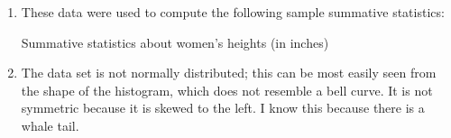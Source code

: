 \documentclass{article}
\begin{document}
\begin{enumerate}
  \item These data were used to compute the following sample summative statistics:
    \begin{table}[H]
      \centering
      \caption{Summative statistics about women's heights (in inches)}
      
    \end{table}

  \item The data set is not normally distributed; this can be most easily seen from the shape of the histogram, which does not resemble a bell curve. It is not symmetric because it is skewed to the left. I know this because there is a whale tail.
\end{enumerate}
\end{document}

